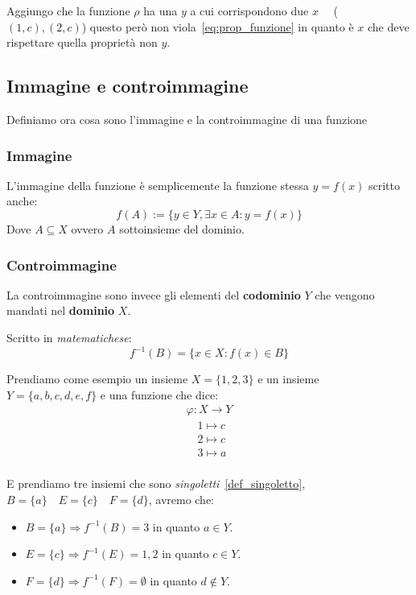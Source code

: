\documentclass{article}
\begin{document}
Aggiungo che la funzione $ \rho $ ha una $ y $ a cui corrispondono due $ x \quad $ ($ (1,c), (2,c) $) questo però non viola~\ref{eq:prop_funzione} in quanto è $ x $ che deve rispettare quella proprietà non $ y $.  



\subsection{Immagine e controimmagine}
Definiamo ora cosa sono l'immagine e la controimmagine di una funzione

\subsubsection{Immagine}
L'immagine della funzione è semplicemente la funzione stessa $ y = f(x) $ scritto anche:
\begin{equation*}
        f(A) := \{y \in Y, \exists x \in A : y = f(x) \}
\end{equation*}
Dove $ A \subseteq X $ ovvero $ A $ sottoinsieme del dominio. \newline  

\subsubsection{Controimmagine}
La controimmagine sono invece gli elementi del \textbf{codominio} $ Y $ che vengono mandati nel \textbf{dominio} $ X $. \par 
Scritto in \textit{matematichese}:
\begin{equation*}
        {f}^{-1}(B) = \{ x \in X : f(x) \in B  \}
\end{equation*}
 
Prendiamo come esempio un insieme $ X = \{1,2,3\}$ e un insieme $ Y = \{a,b,c,d,e,f\} $  e una funzione che dice:
\begin{align*}
        \varphi : X \to Y \\
        \quad 1 \mapsto c \\
        \quad 2 \mapsto c \\
        \quad 3 \mapsto a \\
\end{align*}

E prendiamo tre insiemi che sono \textit{singoletti}~\ref{def_singoletto}, $ B = \{a\} \quad E = \{c\} \quad F = \{d\}$, avremo che:
\begin{itemize}
        \item $ B = \{a\} \Rightarrow {f}^{-1}(B) = {3} $ in quanto $ a \in Y $. 
        \item $ E = \{c\} \Rightarrow {f}^{-1}(E) = {1,2}$ in quanto $ c \in Y $.  
        \item $ F = \{d\} \Rightarrow {f}^{-1}(F) = {\emptyset} $ in quanto $ d \not \in Y $.
\end{itemize}
\end{document}
